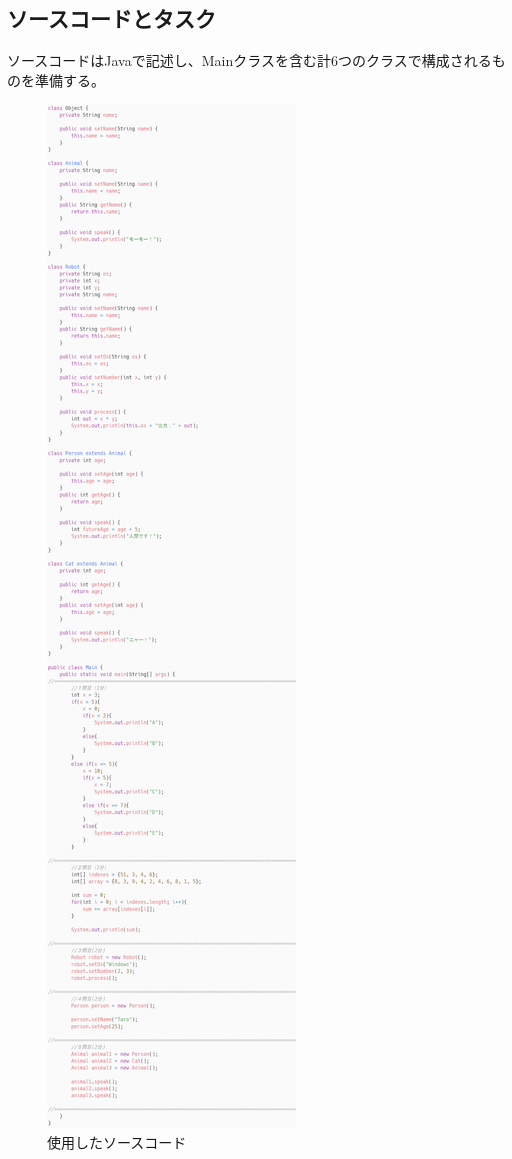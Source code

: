 \documentclass[paper=a4paper,fontsize=10pt]{jlreq}
\begin{document}
    \subsection{ソースコードとタスク}
      ソースコードはJavaで記述し、Mainクラスを含む計6つのクラスで構成されるものを準備する。
      \begin{figure}[htbt]
        \centering
        \includegraphics[height=\textheight]{carbon_clip_resized.png}
        \caption{使用したソースコード}
      \end{figure}
      
\end{document}
